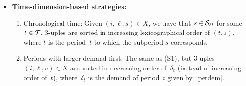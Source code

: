 \documentclass[11pt]{article}
\begin{document}
\begin{itemize}
\item \textbf{Time-dimension-based strategies:}
    \begin{enumerate}[label=(S{{\arabic*}})]
    \item Chronological time: Given $(i, \ell, s) \in X$, we have that $s \in {\cal S}_{\ell t}$ for some $t \in {\cal T}$. 3-uples are sorted in increasing lexicographical order of $(t,s)$, where $t$ is the period~$t$ to which the subperiod $s$ corresponds.
    \item Periods with larger demand first: The same as (S1), but 3-uples $(i, \ell, s) \in X$ are sorted in decreasing order of~$\delta_t$ (instead of increasing order of~$t$), where~$\delta_t$ is the demand of period~$t$ given by~\eqref{perdem}.  
    \end{enumerate}


\end{itemize}
\end{document}
